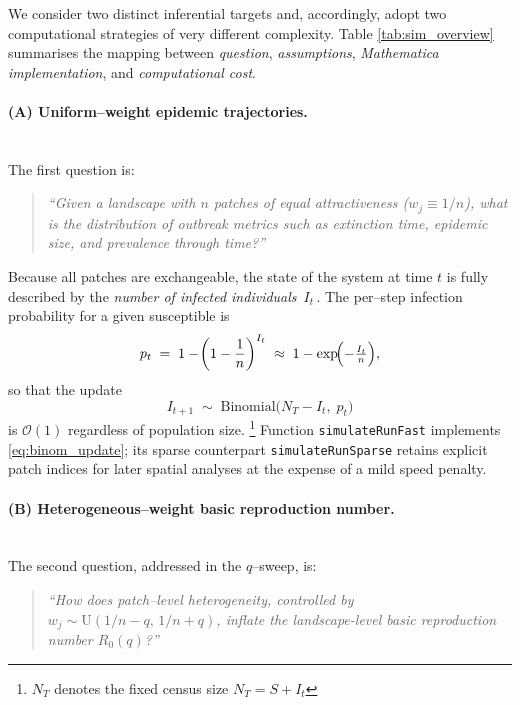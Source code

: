 We consider two distinct inferential targets and, accordingly, adopt two computational strategies of very different complexity.  Table \ref{tab:sim_overview} summarises the mapping between \emph{question}, \emph{assumptions}, \emph{Mathematica implementation}, and \emph{computational cost}.

\paragraph{(A) Uniform--weight epidemic trajectories.}\mbox{}\\

The first question is: \begin{quote} \textit{“Given a landscape with $n$ patches of equal attractiveness ($w_j \equiv 1/n$), what is the distribution of outbreak metrics such as extinction time, epidemic size, and prevalence through time?”} \end{quote}

\noindent
Because all patches are exchangeable, the state of the system at time $t$ is fully described by the \emph{number of infected individuals} $\,I_t\,$.  The per--step infection probability for a given susceptible is
\begin{equation}
  p_t \;=\;
  1-\!\left(1-\frac1n\right)^{I_t}
  \;\approx\;
  1-\exp\!\Bigl(-\tfrac{I_t}{n}\Bigr),
  \label{eq:pt_uniform}
\end{equation}
so that the update
\begin{equation}
  I_{t+1} \;\sim\;
  \text{Binomial}\!\bigl(N_T-I_t,\;p_t\bigr)
  \label{eq:binom_update}
\end{equation}
is $\mathcal O(1)$ regardless of population size.%
\footnote{%
$N_T$ denotes the fixed census size
$N_T=S+I_t$}
Function \texttt{\color{blue}simulateRunFast} implements
\eqref{eq:binom_update}; its sparse
counterpart \texttt{\color{blue}simulateRunSparse} retains explicit patch indices for later spatial analyses at the expense of a mild speed penalty.

\paragraph{(B) Heterogeneous--weight basic reproduction number.}\mbox{}\\

The second question, addressed in the $q$–sweep, is: \begin{quote} \textit{“How does patch--level heterogeneity, controlled by $w_j \sim \text{U}(1/n-q,\,1/n+q)$, inflate the landscape-level basic reproduction number $R_0(q)$?”} \end{quote}

